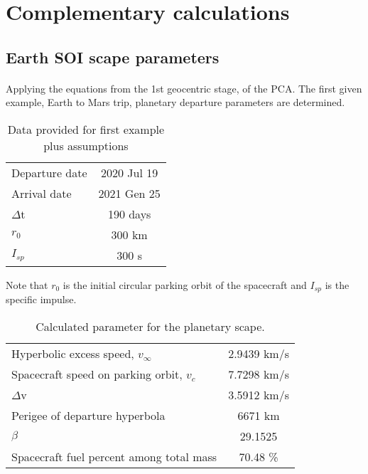 \section{Complementary calculations}
	\subsection{Earth SOI scape parameters}
	\paragraph{} Applying the equations from the 1st geocentric stage, of the PCA. The first given example, Earth to Mars trip, planetary departure parameters are determined.
	
	\begin{table}[H]
		\centering
		\begin{tabular}{|lc|}
			\hline
			Departure date              & 2020 Jul 19                \\ 
			Arrival date                & 2021 Gen 25 \\ 
			$\Delta$t                    & 190 days                   \\ 
			$r_0$                          & 300 km  \\ 
			$I_{sp}$                          & 300 s  \\
			 \hline
		\end{tabular}
		\caption{Data provided for first example plus assumptions }
	\end{table}
	Note that $r_0$ is the initial circular parking orbit of the spacecraft and $I_{sp}$  is the specific impulse.
	
	\begin{table}[H]
		\centering
		\begin{tabular}{|lc|}
			\hline
			Hyperbolic excess speed, $v_\infty$              & 2.9439 km/s                \\ 
			Spacecraft speed on parking orbit, $v_c$                & 7.7298 km/s\\ 
			$\Delta$v                    & 3.5912 km/s                   \\ 
			Perigee of departure hyperbola                          & 6671 km  \\ 
			$\beta$                          & 29.1525 \textdegree \\
			Spacecraft fuel percent among total mass                          & 70.48 \%  \\
			\hline
		\end{tabular}
		\caption{Calculated parameter for the planetary scape.}
	\end{table}
	
